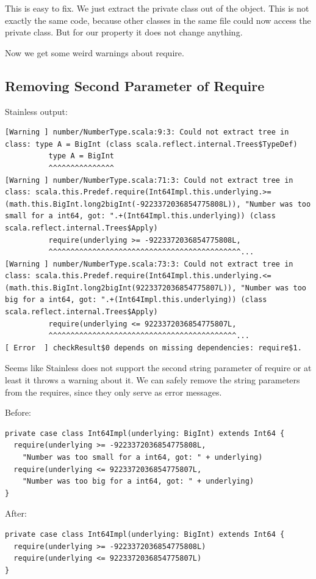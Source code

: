\documentclass[runningheads]{llncs}
\begin{document}
This is easy to fix.
We just extract the private class out of the object.
This is not exactly the same code, because other classes in the same file could now access the private class.
But for our property it does not change anything.

Now we get some weird warnings about require.


\subsection{Removing Second Parameter of Require}

Stainless output:
\begin{lstlisting}[style=stainless]
[Warning ] number/NumberType.scala:9:3: Could not extract tree in class: type A = BigInt (class scala.reflect.internal.Trees$TypeDef)
          type A = BigInt
          ^^^^^^^^^^^^^^^
[Warning ] number/NumberType.scala:71:3: Could not extract tree in class: scala.this.Predef.require(Int64Impl.this.underlying.>=(math.this.BigInt.long2bigInt(-9223372036854775808L)), "Number was too small for a int64, got: ".+(Int64Impl.this.underlying)) (class scala.reflect.internal.Trees$Apply)
          require(underlying >= -9223372036854775808L,
          ^^^^^^^^^^^^^^^^^^^^^^^^^^^^^^^^^^^^^^^^^^^^...
[Warning ] number/NumberType.scala:73:3: Could not extract tree in class: scala.this.Predef.require(Int64Impl.this.underlying.<=(math.this.BigInt.long2bigInt(9223372036854775807L)), "Number was too big for a int64, got: ".+(Int64Impl.this.underlying)) (class scala.reflect.internal.Trees$Apply)
          require(underlying <= 9223372036854775807L,
          ^^^^^^^^^^^^^^^^^^^^^^^^^^^^^^^^^^^^^^^^^^^...
[ Error  ] checkResult$0 depends on missing dependencies: require$1.
\end{lstlisting}

Seems like Stainless does not support the second string parameter of require or at least it throws a warning about it.
We can safely remove the string parameters from the requires, since they only serve as error messages.

Before:
\begin{lstlisting}[style=scala]
private case class Int64Impl(underlying: BigInt) extends Int64 {
  require(underlying >= -9223372036854775808L,
    "Number was too small for a int64, got: " + underlying)
  require(underlying <= 9223372036854775807L,
    "Number was too big for a int64, got: " + underlying)
}
\end{lstlisting}

After:
\begin{lstlisting}[style=scala]
private case class Int64Impl(underlying: BigInt) extends Int64 {
  require(underlying >= -9223372036854775808L)
  require(underlying <= 9223372036854775807L)
}
\end{lstlisting}
\end{document}
